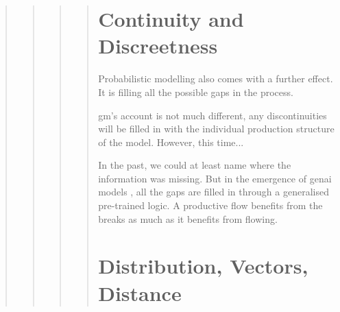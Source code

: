 \begin{quote}
\begin{quote}
\begin{quote}
\begin{quote}
{%
%
%
%
%
%

\section{Continuity and Discreetness}
Probabilistic modelling also comes with a further effect. It is filling all the
possible gaps in the process.

\gls{gm}'s account is not much different, any discontinuities will be filled in
with the individual production structure of the model. However, this time...

\begin{orangebox}
	In the past, we could at least name where the information was missing. But in
	the emergence of \gls{genai} models , all the gaps are filled in through a
	generalised pre-trained logic. A productive flow benefits from the breaks as
	much as it benefits from flowing.
\end{orangebox}

\section{Distribution, Vectors, Distance}


}
\end{quote}
\end{quote}
\end{quote}
\end{quote}

